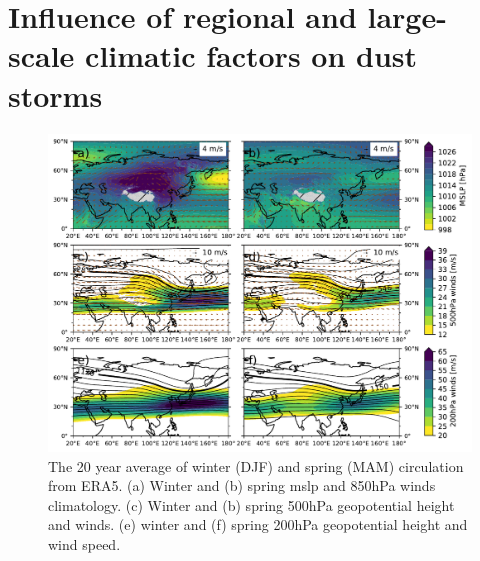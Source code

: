 \section{Influence of regional and large-scale climatic factors on dust storms}
\begin{figure}[htpb]
    \centering
    \includegraphics[width=\textwidth]{texfiles/figs/climatology_1999-2019.pdf}
    \caption{The 20 year average of winter (DJF)  and spring (MAM) circulation from ERA5. (a) Winter and (b) spring \acrshort{mslp} and 850hPa winds climatology. (c) Winter and (b) spring 500hPa geopotential height and winds. (e) winter and (f) spring 200hPa geopotential height and wind speed.}
    \label{fig:clim_circulation}
\end{figure}

